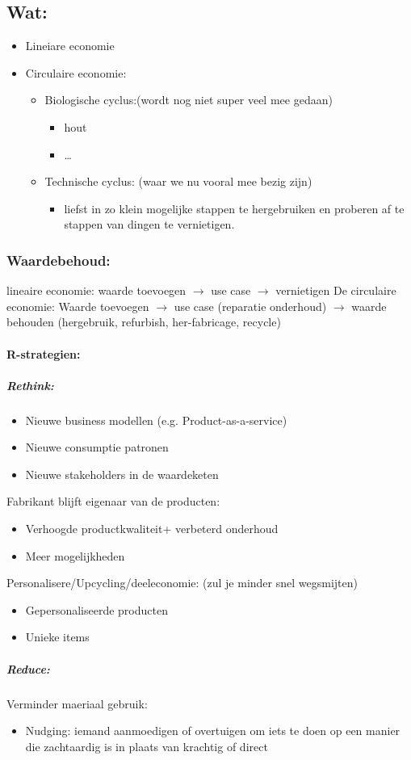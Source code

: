 \documentclass[12pt]{article}
\begin{document}
\subsection{Wat:}
\begin{itemize}
    \item Lineiare economie
    \item Circulaire economie:\begin{itemize}
        \item Biologische cyclus:(wordt nog niet super veel mee gedaan)\begin{itemize}
            \item hout 
            \item \dots
        \end{itemize}
        \item Technische cyclus: (waar we nu vooral mee bezig zijn)\begin{itemize}
            \item liefst in zo klein mogelijke stappen te hergebruiken en proberen af te stappen van dingen te vernietigen.
        \end{itemize}
    \end{itemize}
\end{itemize}
\subsubsection{Waardebehoud:}
lineaire economie:
waarde toevoegen $\rightarrow$ use case $\rightarrow$ vernietigen
De circulaire economie:
Waarde toevoegen $\rightarrow$ use case (reparatie onderhoud) $\rightarrow$ waarde behouden (hergebruik, refurbish, her-fabricage, recycle)
\paragraph{R-strategien:}
\subparagraph{Rethink:}
\begin{itemize}
    \item Nieuwe business modellen (e.g. Product-as-a-service)
    \item Nieuwe consumptie patronen 
    \item Nieuwe stakeholders in de waardeketen
\end{itemize}
Fabrikant blijft eigenaar van de producten:
\begin{itemize}
    \item Verhoogde productkwaliteit+ verbeterd onderhoud 
    \item Meer mogelijkheden
\end{itemize}
Personalisere/Upcycling/deeleconomie: (zul je minder snel wegsmijten)\begin{itemize}
    \item Gepersonaliseerde producten 
    \item Unieke items
\end{itemize}
\subparagraph{Reduce:}
Verminder maeriaal gebruik:\begin{itemize}
    \item Nudging: iemand aanmoedigen of overtuigen om iets te doen op een manier die zachtaardig is in plaats van krachtig of direct
\end{itemize}
\end{document}
